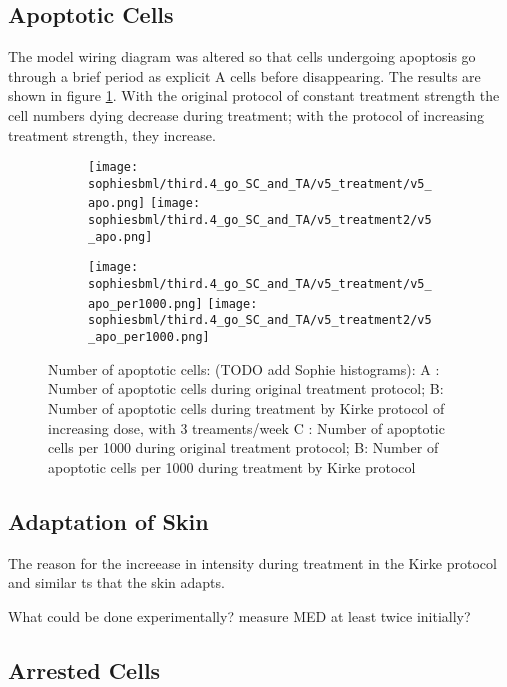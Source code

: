 \documentclass[a4paper,10pt]{report}
\newcommand{\psortbase}{/home/ngrs2/work/bsu/PSORT_Zuliani_Reynolds/}
\newcommand{\sbmlbase}{\psortbase/sbml-sh/}
\newcommand{\sophiesbml}{\sbmlbase/sophie_like}
\begin{document}
\subsection{Apoptotic Cells}

The model wiring diagram was altered so that cells undergoing apoptosis go through a brief period as explicit A cells before disappearing. The results are shown in figure   \ref{fig:thirdpoint4sophie_treatment_apo}. With the original protocol of constant treatment strength the cell numbers dying decrease during treatment; with the protocol of increasing treatment strength, they increase. 


\begin{figure}[h!]
  \begin{subfigure}{\textwidth}
    \subcaptionbox{}
    {\texttt{[image: \\sophiesbml/third.4\_go\_SC\_and\_TA/v5\_treatment/v5\_apo.png]}}
    \subcaptionbox{}
    {\texttt{[image: \\sophiesbml/third.4\_go\_SC\_and\_TA/v5\_treatment2/v5\_apo.png]}}
  \end{subfigure}
  \begin{subfigure}{\textwidth}
    \subcaptionbox{}
    {\texttt{[image: \\sophiesbml/third.4\_go\_SC\_and\_TA/v5\_treatment/v5\_apo\_per1000.png]}}
    \subcaptionbox{}
    {\texttt{[image: \\sophiesbml/third.4\_go\_SC\_and\_TA/v5\_treatment2/v5\_apo\_per1000.png]}}
  \end{subfigure}
  \caption{Number of apoptotic cells: (TODO add Sophie histograms): A : Number of apoptotic cells during original treatment protocol; B: Number of apoptotic cells during treatment by Kirke protocol of increasing dose, with 3 treaments/week
C : Number of apoptotic cells per 1000 during original treatment protocol; B: Number of apoptotic cells per 1000 during treatment by Kirke protocol}
  \label{fig:thirdpoint4sophie_treatment_apo}
\end{figure}


\subsection{Adaptation of Skin}

The reason for the increease in intensity during treatment in the Kirke protocol and similar ts that the skin adapts.



What could be done experimentally? measure MED at least twice initially? 

\subsection{Arrested Cells}
\end{document}
